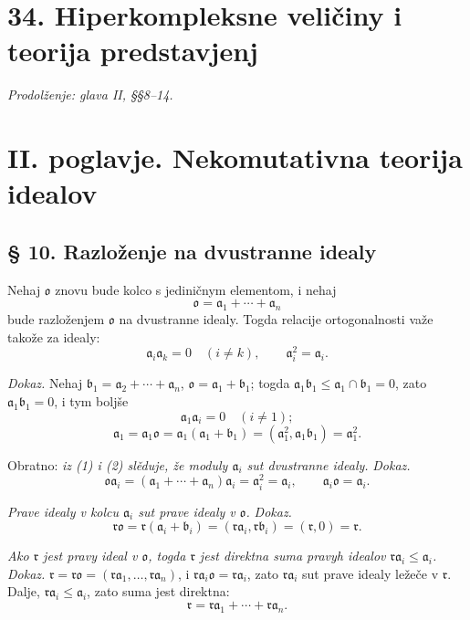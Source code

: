 \documentclass[11pt]{article}
\providecommand{\ma}{\mathfrak{a}}
\providecommand{\mb}{\mathfrak{b}}
\providecommand{\mo}{\mathfrak{o}}
\providecommand{\mr}{\mathfrak{r}}
\begin{document}
\section*{34. Hiperkompleksne veličiny i teorija predstavjenj}
\emph{Prodolženje: glava II, §§8--14.}

\section*{II. poglavje. Nekomutativna teorija idealov}

\subsection*{§ 10. Razloženje na dvustranne idealy}

Nehaj $\mo$ znovu bude kolco s jediničnym elementom, i nehaj
\begin{equation}
        \mo=\ma_1+\cdots+\ma_n                                  \tag{1}
\end{equation}
bude razloženjem $\mo$ na dvustranne idealy. Togda relacije ortogonalnosti važe takože za idealy:
\begin{equation}
        \ma_i\ma_k=0\quad(i\ne k),
        \qquad
        \ma_i^2=\ma_i.                                             \tag{2}
\end{equation}

\emph{Dokaz.} Nehaj $\mb_1=\ma_2+\cdots+\ma_n$, $\mo=\ma_1+\mb_1$; togda $\ma_1\mb_1\leq \ma_1\cap\mb_1=0$, zato $\ma_1\mb_1=0$, i tym boljše
\[
        \ma_1\ma_i=0\quad(i\ne1);
\]
\[
        \ma_1=\ma_1\mo=\ma_1(\ma_1+\mb_1)=(\ma_1^2,\ma_1\mb_1)=\ma_1^2.
\]

Obratno: \emph{iz (1) i (2) slěduje, že moduly $\ma_i$ sut dvustranne idealy.}
\emph{Dokaz.}
\[
        \mo\ma_i=(\ma_1+\cdots+\ma_n)\ma_i=\ma_i^2=\ma_i,
        \qquad
        \ma_i\mo=\ma_i.
\]

\emph{Prave idealy v kolcu $\ma_i$ sut prave idealy v $\mo$.}
\emph{Dokaz.}
\[
        \mr\mo=\mr(\ma_i+\mb_i)=(\mr\ma_i,\mr\mb_i)=(\mr,0)=\mr.
\]

\emph{Ako $\mr$ jest pravy ideal v $\mo$, togda $\mr$ jest direktna suma pravyh idealov $\mr\ma_i\leq\ma_i$.}
\emph{Dokaz.} $\mr=\mr\mo=(\mr\ma_1,\ldots,\mr\ma_n)$, i $\mr\ma_i\mo=\mr\ma_i$, zato $\mr\ma_i$ sut prave idealy ležeče v $\mr$. Dalje, $\mr\ma_i\leq\ma_i$, zato suma jest direktna:
\[
        \mr=\mr\ma_1+\cdots+\mr\ma_n.
\]
\end{document}
